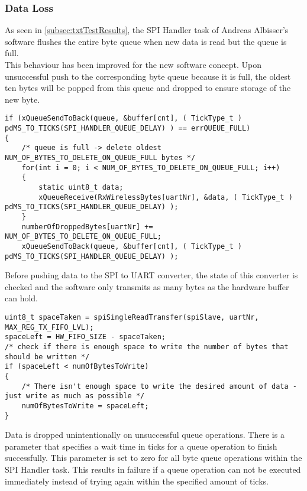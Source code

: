 \subsubsection{Data Loss}
As seen in \autoref{subsec:txtTestResults}, the SPI Handler task of Andreas Albisser's software flushes the entire byte queue when new data is read but the queue is full.\\
This behaviour has been improved for the new software concept. Upon unsuccessful push to the corresponding byte queue because it is full, the oldest ten bytes will be popped from this queue and dropped to ensure storage of the new byte.\\
\begin{lstlisting}
if (xQueueSendToBack(queue, &buffer[cnt], ( TickType_t ) pdMS_TO_TICKS(SPI_HANDLER_QUEUE_DELAY) ) == errQUEUE_FULL)
{
    /* queue is full -> delete oldest NUM_OF_BYTES_TO_DELETE_ON_QUEUE_FULL bytes */
    for(int i = 0; i < NUM_OF_BYTES_TO_DELETE_ON_QUEUE_FULL; i++)
    {
        static uint8_t data;
        xQueueReceive(RxWirelessBytes[uartNr], &data, ( TickType_t ) pdMS_TO_TICKS(SPI_HANDLER_QUEUE_DELAY) );
    }
    numberOfDroppedBytes[uartNr] += NUM_OF_BYTES_TO_DELETE_ON_QUEUE_FULL;
    xQueueSendToBack(queue, &buffer[cnt], ( TickType_t ) pdMS_TO_TICKS(SPI_HANDLER_QUEUE_DELAY) );
\end{lstlisting}
Before pushing data to the SPI to UART converter, the state of this converter is checked and the software only transmits as many bytes as the hardware buffer can hold.
\begin{lstlisting}
uint8_t spaceTaken = spiSingleReadTransfer(spiSlave, uartNr, MAX_REG_TX_FIFO_LVL);
spaceLeft = HW_FIFO_SIZE - spaceTaken;
/* check if there is enough space to write the number of bytes that should be written */
if (spaceLeft < numOfBytesToWrite)
{
    /* There isn't enough space to write the desired amount of data - just write as much as possible */
    numOfBytesToWrite = spaceLeft;
}
\end{lstlisting}
Data is dropped unintentionally on unsuccessful queue operations. There is a parameter that specifies a wait time in ticks for a queue operation to finish successfully. This parameter is set to zero for all byte queue operations within the SPI Handler task. This results in failure if a queue operation can not be executed immediately instead of trying again within the specified amount of ticks.
